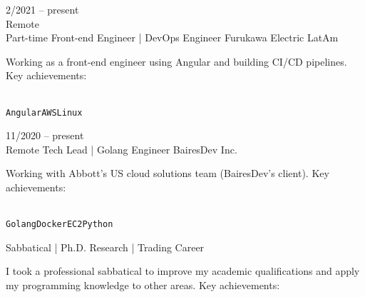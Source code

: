 \documentclass[10pt]{developercv} %
\begin{document}


\begin{entrylist}
  \entry
  {2/2021 -- present\\\footnotesize{Remote}\\\footnotesize{Part-time}}
  {Front-end Engineer | DevOps Engineer}
  {Furukawa Electric LatAm}
  {Working as a front-end engineer using Angular and building CI/CD pipelines. Key achievements:\\
    \begin{contributionlist}
    \end{contributionlist}\\
    \texttt{Angular}\slashsep\texttt{AWS}\slashsep\texttt{Linux}}
  \entry
  {11/2020 -- present\\\footnotesize{Remote}}
  {Tech Lead | Golang Engineer}
  {BairesDev Inc.}
  {Working with Abbott's US cloud solutions team (BairesDev's client). Key achievements:\\
    \begin{contributionlist}
    \end{contributionlist}\\
    \texttt{Golang}\slashsep\texttt{Docker}\slashsep\texttt{EC2}\slashsep\texttt{Python}}
  {Sabbatical | Ph.D. Research | Trading Career}
  {}
  {
    I took a professional sabbatical to improve my academic qualifications and apply my programming knowledge to other areas. Key achievements:\\
    \begin{contributionlist}

\end{contributionlist}}
\end{entrylist}
\end{document}
